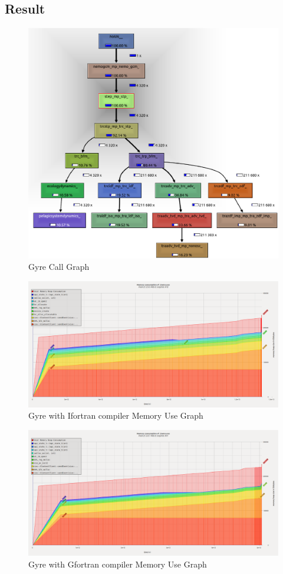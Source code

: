 \subsection{Result}

\begin{figure}
  \centering
  \includegraphics[width=\textwidth]{img/callgrind_gyre}
  \caption{Gyre Call Graph}
  \label{fig:callgrind_std}
\end{figure}

\clearpage

\begin{figure}
  \centering
  \includegraphics[width=\textwidth]{img/massif_gyre_mi}
  \caption{Gyre with Ifortran compiler Memory Use Graph}
  \label{fig:massif_std}
\end{figure}

\begin{figure}
  \centering
  \includegraphics[width=\textwidth]{img/massif_gyre_mg}
  \caption{Gyre with Gfortran compiler Memory Use Graph}
  \label{fig:massif_std}
\end{figure}
